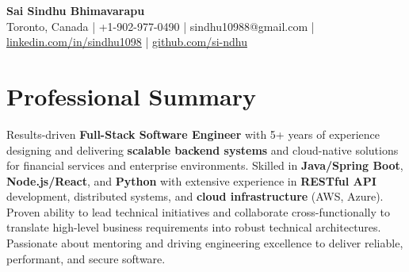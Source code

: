 \documentclass[letterpaper,11pt]{article}
\begin{document}
\begin{center}
  {\Large \textbf{Sai Sindhu Bhimavarapu}} \\
  Toronto, Canada \enspace | \enspace +1-902-977-0490 \enspace | \enspace sindhu10988@gmail.com \enspace | \enspace \href{https://www.linkedin.com/in/sindhu1098/}{linkedin.com/in/sindhu1098} \enspace | \enspace \href{https://github.com/si-ndhu}{github.com/si-ndhu}
\end{center}

\section{Professional Summary}
  \begin{itemize}[leftmargin=0.15in, label={}]
    \small{\item{
     Results-driven \textbf{Full-Stack Software Engineer} with 5+ years of experience designing and delivering \textbf{scalable backend systems} and cloud-native solutions for financial services and enterprise environments. Skilled in \textbf{Java/Spring Boot}, \textbf{Node.js/React}, and \textbf{Python} with extensive experience in \textbf{RESTful API} development, distributed systems, and \textbf{cloud infrastructure} (AWS, Azure). Proven ability to lead technical initiatives and collaborate cross-functionally to translate high-level business requirements into robust technical architectures. Passionate about mentoring and driving engineering excellence to deliver reliable, performant, and secure software.
    }}
  \end{itemize}
\vspace{-16pt}

\end{document}
